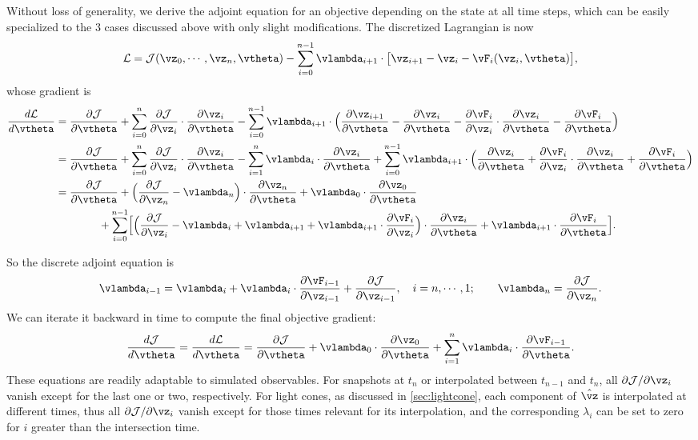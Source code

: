 \documentclass[modern, dvipsnames]{aastex631}
\renewcommand{\d}{d}
\newcommand{\p}{\partial}
\newcommand{\cJ}{\mathcal{J}}
\newcommand{\cL}{\mathcal{L}}
\begin{document}
Without loss of generality, we derive the adjoint equation for an
objective depending on the state at all time steps, which can be easily
specialized to the 3 cases discussed above with only slight
modifications.
The discretized Lagrangian is now
%
\begin{equation}
\cL = \cJ(\vz_0, \cdots, \vz_n, \vtheta)
- \sum_{i=0}^{n-1} \vlambda_{i+1}
  \cdot \bigl[ \vz_{i+1} - \vz_i - \vF_i(\vz_i, \vtheta) \bigr],
\end{equation}
%
whose gradient is
%
\begin{align}
\frac{\d\cL}{\d\vtheta}
&= \frac{\p\cJ}{\p\vtheta}
+ \sum_{i=0}^n \frac{\p\cJ}{\p\vz_i} \cdot \frac{\p\vz_i}{\p\vtheta}
- \sum_{i=0}^{n-1} \vlambda_{i+1}
  \cdot \Bigl( \frac{\p\vz_{i+1}}{\p\vtheta} - \frac{\p\vz_i}{\p\vtheta}
    - \frac{\p\vF_i}{\p\vz_i} \cdot \frac{\p\vz_i}{\p\vtheta}
    - \frac{\p\vF_i}{\p\vtheta} \Bigr) \nonumber\\
%
&= \frac{\p\cJ}{\p\vtheta}
+ \sum_{i=0}^n \frac{\p\cJ}{\p\vz_i} \cdot \frac{\p\vz_i}{\p\vtheta}
- \sum_{i=1}^n \vlambda_i \cdot \frac{\p\vz_i}{\p\vtheta}
+ \sum_{i=0}^{n-1} \vlambda_{i+1}
  \cdot \Bigl( \frac{\p\vz_i}{\p\vtheta}
    + \frac{\p\vF_i}{\p\vz_i} \cdot \frac{\p\vz_i}{\p\vtheta}
    + \frac{\p\vF_i}{\p\vtheta} \Bigr) \nonumber\\
&= \frac{\p\cJ}{\p\vtheta}
+ \Bigl( \frac{\p\cJ}{\p\vz_n} - \vlambda_n \Bigr)
  \cdot \frac{\p\vz_n}{\p\vtheta}
+ \vlambda_0 \cdot \frac{\p\vz_0}{\p\vtheta} \nonumber\\
&\hspace{4em} + \sum_{i=0}^{n-1} \Bigl[
  \Bigl( \frac{\p\cJ}{\p\vz_i} - \vlambda_i + \vlambda_{i+1}
    + \vlambda_{i+1} \cdot \frac{\p\vF_i}{\p\vz_i} \Bigr)
  \cdot \frac{\p\vz_i}{\p\vtheta}
  + \vlambda_{i+1} \cdot \frac{\p\vF_i}{\p\vtheta} \Bigr].
\end{align}

So the discrete adjoint equation is
%
\begin{equation}
\vlambda_{i-1} = \vlambda_i
  + \vlambda_i \cdot \frac{\p\vF_{i-1}}{\p\vz_{i-1}}
  + \frac{\p\cJ}{\p\vz_{i-1}},
\quad
i = n, \cdots, 1;
\qquad
\vlambda_n = \frac{\p\cJ}{\p\vz_n}.
\label{explicit_adj}
\end{equation}
%
We can iterate it backward in time to compute the final objective
gradient:
%
\begin{equation}
\frac{\d\cJ}{\d\vtheta}
= \frac{\d\cL}{\d\vtheta}
= \frac{\p\cJ}{\p\vtheta} + \vlambda_0 \cdot \frac{\p\vz_0}{\p\vtheta}
+ \sum_{i=1}^n \vlambda_i \cdot \frac{\p\vF_{i-1}}{\p\vtheta}.
\label{explicit_grad}
\end{equation}
%
These equations are readily adaptable to simulated observables.
For snapshots at $t_n$ or interpolated between $t_{n-1}$ and $t_n$,
all $\p\cJ / \p\vz_i$ vanish except for the last one or two,
respectively.
For light cones, as discussed in \autoref{sec:lightcone}, each component
of $\hat\vz$ is interpolated at different times, thus all $\p\cJ /
\p\vz_i$ vanish except for those times relevant for its interpolation,
and the corresponding $\lambda_i$ can be set to zero for $i$ greater
than the intersection time.
\end{document}
